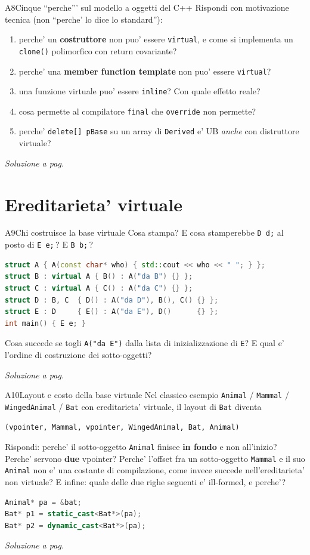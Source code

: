 \documentclass{report}
\newcommand{\code}[1]{\texttt{\small #1}}
\newcommand{\vaisol}[1]{%
    \par\vspace{4pt}\hfill{\footnotesize\itshape\color{gray}%
    Soluzione a pag.~\pageref{sol:#1}}%
}
\begin{document}
\begin{domanda}{A8}{Cinque ``perche''' sul modello a oggetti del C++}
Rispondi con motivazione tecnica (non ``perche' lo dice lo standard''):
\begin{enumerate}
    \item[(a)] perche' un \textbf{costruttore} non puo' essere \code{virtual},
          e come si implementa un \code{clone()} polimorfico con return
          covariante?
    \item[(b)] perche' una \textbf{member function template} non puo' essere
          \code{virtual}?
    \item[(c)] una funzione virtuale puo' essere \code{inline}? Con quale
          effetto reale?
    \item[(d)] cosa permette al compilatore \code{final} che \code{override}
          non permette?
    \item[(e)] perche' \code{delete[] pBase} su un array di \code{Derived} e'
          UB \emph{anche} con distruttore virtuale?
\end{enumerate}
\vaisol{A8}
\end{domanda}

\section{Ereditarieta' virtuale}

\begin{domanda}{A9}{Chi costruisce la base virtuale}
Cosa stampa? E cosa stamperebbe \code{D d;} al posto di \code{E e;}\,? E
\code{B b;}\,?
\begin{lstlisting}[language=C++]
struct A { A(const char* who) { std::cout << who << " "; } };
struct B : virtual A { B() : A("da B") {} };
struct C : virtual A { C() : A("da C") {} };
struct D : B, C  { D() : A("da D"), B(), C() {} };
struct E : D     { E() : A("da E"), D()      {} };
int main() { E e; }
\end{lstlisting}
Cosa succede se togli \code{A("da E")} dalla lista di inizializzazione di
\code{E}? E qual e' l'ordine di costruzione dei sotto-oggetti?
\vaisol{A9}
\end{domanda}

\begin{domanda}{A10}{Layout e costo della base virtuale}
Nel classico esempio \code{Animal} / \code{Mammal} / \code{WingedAnimal} /
\code{Bat} con ereditarieta' virtuale, il layout di \code{Bat} diventa
\begin{center}
\code{(vpointer, Mammal, vpointer, WingedAnimal, Bat, Animal)}
\end{center}
Rispondi: perche' il sotto-oggetto \code{Animal} finisce \textbf{in fondo} e non
all'inizio? Perche' servono \textbf{due} vpointer? Perche' l'offset fra un
sotto-oggetto \code{Mammal} e il suo \code{Animal} non e' una costante di
compilazione, come invece succede nell'ereditarieta' non virtuale? E infine:
quale delle due righe seguenti e' ill-formed, e perche'?
\begin{lstlisting}[language=C++]
Animal* pa = &bat;
Bat* p1 = static_cast<Bat*>(pa);
Bat* p2 = dynamic_cast<Bat*>(pa);
\end{lstlisting}
\vaisol{A10}
\end{domanda}
\end{document}
